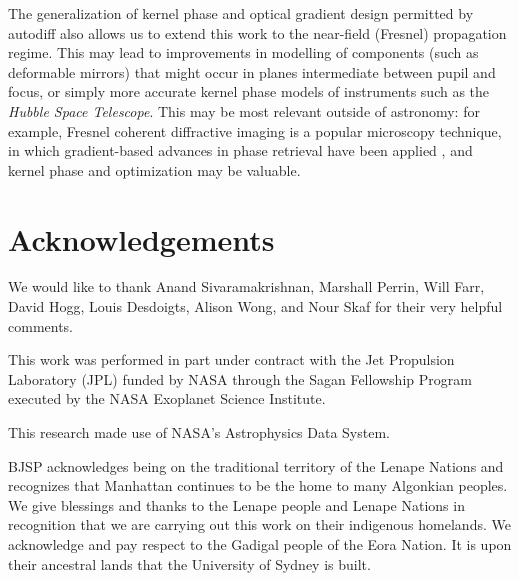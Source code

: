 \documentclass[modern]{aastex63}
\begin{document}
The generalization of kernel phase and optical gradient design permitted by autodiff also allows us to extend this work to the near-field (Fresnel) propagation regime. This may lead to improvements in modelling of components (such as deformable mirrors) that might occur in planes intermediate between pupil and focus, or simply more accurate kernel phase models of instruments such as the \textit{Hubble Space Telescope}. This may be most relevant outside of astronomy: for example, Fresnel coherent diffractive imaging \citep{williams2006} is a popular microscopy technique, in which gradient-based advances in phase retrieval have been applied \citep{Dueaay3700}, and kernel phase and optimization may be valuable. 

\section*{Acknowledgements} %

We would like to thank Anand Sivaramakrishnan, Marshall Perrin, Will Farr, David Hogg, Louis Desdoigts, Alison Wong, and Nour Skaf for their very helpful comments. 

This work was performed in part under contract with the Jet Propulsion Laboratory (JPL) funded by NASA through the Sagan Fellowship Program executed by the NASA Exoplanet Science Institute. 

This research made use of NASA's Astrophysics Data System.

BJSP acknowledges being on the traditional territory of the Lenape Nations and recognizes that Manhattan continues to be the home to many Algonkian peoples. We give blessings and thanks to the Lenape people and Lenape Nations in recognition that we are carrying out this work on their indigenous homelands. We acknowledge and pay respect to the Gadigal people of the Eora Nation. It is upon their ancestral lands that the University of Sydney is built.









\end{document}
